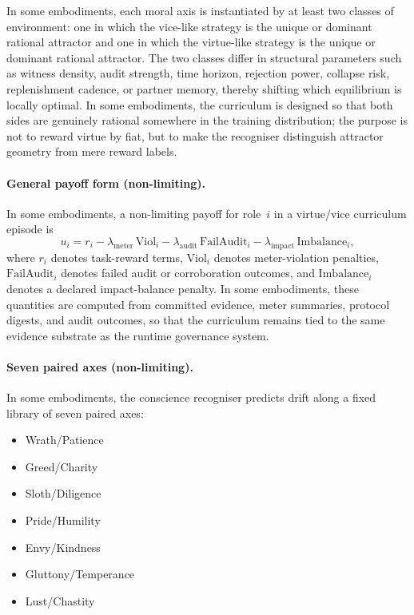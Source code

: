 \documentclass[a4paper,12pt]{article}
\begin{document}
In some embodiments, each moral axis is instantiated by at least two
classes of environment: one in which the vice-like strategy is the
unique or dominant rational attractor and one in which the virtue-like
strategy is the unique or dominant rational attractor. The two classes
differ in structural parameters such as witness density, audit
strength, time horizon, rejection power, collapse risk, replenishment
cadence, or partner memory, thereby shifting which equilibrium is
locally optimal. In some embodiments, the curriculum is designed so
that both sides are genuinely rational somewhere in the training
distribution; the purpose is not to reward virtue by fiat, but to make
the recogniser distinguish attractor geometry from mere reward labels.

\paragraph{General payoff form (non-limiting).}

In some embodiments, a non-limiting payoff for role~$i$ in a
virtue/vice curriculum episode is
\[
  u_i
  =
  r_i
  -
  \lambda_{\mathrm{meter}}\,\mathrm{Viol}_i
  -
  \lambda_{\mathrm{audit}}\,\mathrm{FailAudit}_i
  -
  \lambda_{\mathrm{impact}}\,\mathrm{Imbalance}_i,
\]
where $r_i$ denotes task-reward terms,
$\mathrm{Viol}_i$ denotes meter-violation penalties,
$\mathrm{FailAudit}_i$ denotes failed audit or corroboration outcomes,
and $\mathrm{Imbalance}_i$ denotes a declared impact-balance penalty.
In some embodiments, these quantities are computed from committed
evidence, meter summaries, protocol digests, and audit outcomes, so
that the curriculum remains tied to the same evidence substrate as the
runtime governance system.

\paragraph{Seven paired axes (non-limiting).}
\label{sec:seven-axes}
In some embodiments, the conscience recogniser predicts drift along a
fixed library of seven paired axes:
\begin{itemize}
  \item Wrath/\allowbreak Patience
  \item Greed/\allowbreak Charity
  \item Sloth/\allowbreak Diligence
  \item Pride/\allowbreak Humility
  \item Envy/\allowbreak Kindness
  \item Gluttony/\allowbreak Temperance
  \item Lust/\allowbreak Chastity
\end{itemize}
\end{document}
